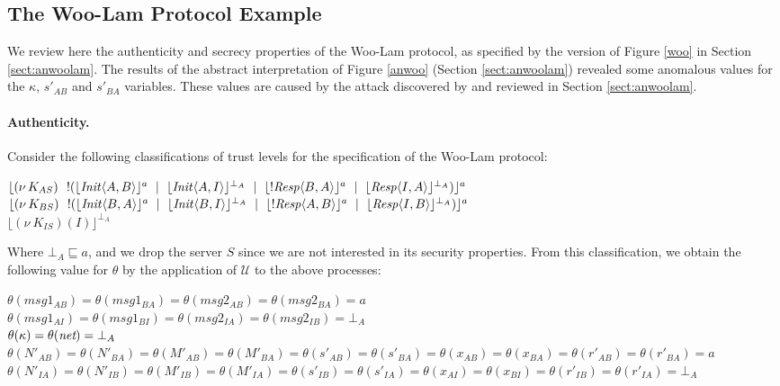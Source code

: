 \documentclass[10pt,a4paper,final,oneside,fleqn]{book}
\begin{document}
\subsection{The Woo-Lam Protocol Example}
We review here the authenticity and secrecy properties of the Woo-Lam protocol, as specified by the version of Figure \ref{woo} in Section \ref{sect:anwoolam}.  The results of the abstract interpretation of Figure \ref{anwoo} (Section \ref{sect:anwoolam}) revealed some anomalous values for the $\kappa$, $s'_{AB}$ and $s'_{BA}$ variables.  These values are caused by the attack discovered by \cite{abadi5} and reviewed in Section \ref{sect:anwoolam}.

\paragraph{Authenticity.} Consider the following classifications of trust levels for the specification of the Woo-Lam protocol:\vspace{6mm}

\noindent
$\lfloor (\nu~\!K_{AS})~~!(\lfloor \mbox{{\itshape Init\/}}\langle A,B\rangle\rfloor^a~\mid~\lfloor \mbox{{\itshape Init\/}}\langle A,I\rangle\rfloor^{\bot_A}~\mid~\lfloor !\mbox{{\itshape Resp\/}}\langle B,A\rangle\rfloor^{a}~\mid~\lfloor \mbox{{\itshape Resp\/}}\langle I,A\rangle\rfloor^{\bot_A})\rfloor^a$\\
$\lfloor (\nu~\!K_{BS})~~!(\lfloor \mbox{{\itshape Init\/}}\langle B,A\rangle\rfloor^a~\mid~\lfloor \mbox{{\itshape Init\/}}\langle B,I\rangle\rfloor^{\bot_A}~\mid~\lfloor !\mbox{{\itshape Resp\/}}\langle A,B\rangle\rfloor^a~\mid~\lfloor \mbox{{\itshape Resp\/}}\langle I,B\rangle\rfloor^{\bot_A})\rfloor^a$\\
$\lfloor (\nu~\!K_{IS})(I)\rfloor^{\bot_A}$\vspace{6mm}

\noindent
Where $\bot_A\sqsubseteq a$, and we drop the server $S$ since we are not interested in its security properties.  From this classification, we obtain the following value for $\theta$ by the application of $\mathcal{U}$ to the above processes:\vspace{6mm}

\noindent $\theta(msg1_{AB})=\theta(msg1_{BA})=\theta(msg2_{AB})=\theta(msg2_{BA})=a$\\
$\theta(msg1_{AI})=\theta(msg1_{BI})=\theta(msg2_{IA})=\theta(msg2_{IB})=\bot_A$\\
$\theta(\kappa)=\theta(\mbox{{\itshape net}})=\bot_A$\\
$\theta(N'_{AB})=\theta(N'_{BA})=\theta(M'_{AB})=\theta(M'_{BA})=\theta(s'_{AB})=\theta(s'_{BA})=\theta(x_{AB})=\theta(x_{BA})=\theta(r'_{AB})=\theta(r'_{BA})=a$\\
$\theta(N'_{IA})=\theta(N'_{IB})=\theta(M'_{IB})=\theta(M'_{IA})=\theta(s'_{IB})=\theta(s'_{IA})=\theta(x_{AI})=\theta(x_{BI})=\theta(r'_{IB})=\theta(r'_{IA})=\bot_A$\vspace{6mm}
\end{document}
